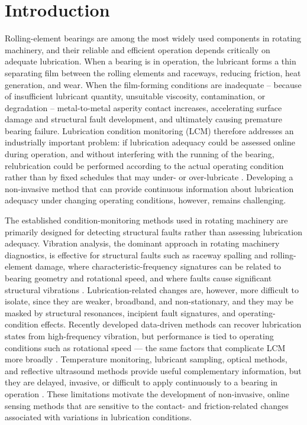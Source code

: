 \section{Introduction}
Rolling-element bearings are among the most widely used components in rotating machinery, and their reliable and efficient operation depends critically on adequate lubrication. When a bearing is in operation, the lubricant forms a thin separating film between the rolling elements and raceways, reducing friction, heat generation, and wear. When the film-forming conditions are inadequate -- because of insufficient lubricant quantity, unsuitable viscosity, contamination, or degradation -- metal-to-metal asperity contact increases, accelerating surface damage and structural fault development, and ultimately causing premature bearing failure. Lubrication condition monitoring (LCM) therefore addresses an industrially important problem: if lubrication adequacy could be assessed online during operation, and without interfering with the running of the bearing, relubrication could be performed according to the actual operating condition rather than by fixed schedules that may under- or over-lubricate \cite{wakiru_review_2019}. Developing a non-invasive method that can provide continuous information about lubrication adequacy under changing operating conditions, however, remains challenging.

The established condition-monitoring methods used in rotating machinery are primarily designed for detecting structural faults rather than assessing lubrication adequacy. Vibration analysis, the dominant approach in rotating machinery diagnostics, is effective for structural faults such as raceway spalling and rolling-element damage, where characteristic-frequency signatures can be related to bearing geometry and rotational speed, and where faults cause significant structural vibrations \cite{wang_phm_2018}. Lubrication-related changes are, however, more difficult to isolate, since they are weaker, broadband, and non-stationary, and they may be masked by structural resonances, incipient fault signatures, and operating-condition effects. Recently developed data-driven methods can recover lubrication states from high-frequency vibration, but performance is tied to operating conditions such as rotational speed --- the same factors that complicate LCM more broadly \cite{zhang_graph_2024,zhang_interpretable_2026,jiang_mechanism_2025}. Temperature monitoring, lubricant sampling, optical methods, and reflective ultrasound methods provide useful complementary information, but they are delayed, invasive, or difficult to apply continuously to a bearing in operation \cite{sun_online_2021,dai_situ_2024,shang_comprehensive_2024}. These limitations motivate the development of non-invasive, online sensing methods that are sensitive to the contact- and friction-related changes associated with variations in lubrication conditions.

